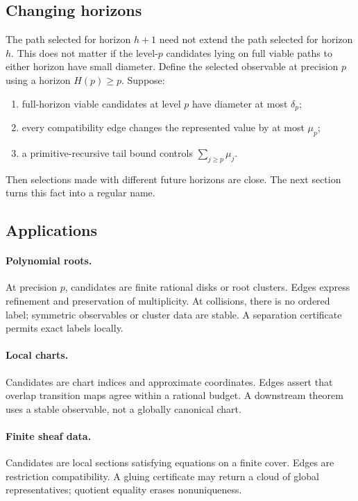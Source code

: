 \subsection{Changing horizons}

The path selected for horizon \(h+1\) need not extend the path selected for
horizon \(h\).  This does not matter if the level-\(p\) candidates lying on
full viable paths to either horizon have small diameter.  Define the selected
observable at precision \(p\) using a horizon \(H(p)\ge p\).  Suppose:
\begin{enumerate}
\item full-horizon viable candidates at level \(p\) have diameter at most
\(\delta_p\);
\item every compatibility edge changes the represented value by at most
\(\mu_p\);
\item a primitive-recursive tail bound controls
\(\sum_{j\ge p}\mu_j\).
\end{enumerate}
Then selections made with different future horizons are close.  The next
section turns this fact into a regular name.

\subsection{Applications}

\paragraph{Polynomial roots.}
At precision \(p\), candidates are finite rational disks or root clusters.
Edges express refinement and preservation of multiplicity.  At collisions,
there is no ordered label; symmetric observables or cluster data are stable.
A separation certificate permits exact labels locally.

\paragraph{Local charts.}
Candidates are chart indices and approximate coordinates.  Edges assert that
overlap transition maps agree within a rational budget.  A downstream theorem
uses a stable observable, not a globally canonical chart.

\paragraph{Finite sheaf data.}
Candidates are local sections satisfying equations on a finite cover.  Edges
are restriction compatibility.  A gluing certificate may return a cloud of
global representatives; quotient equality erases nonuniqueness.

